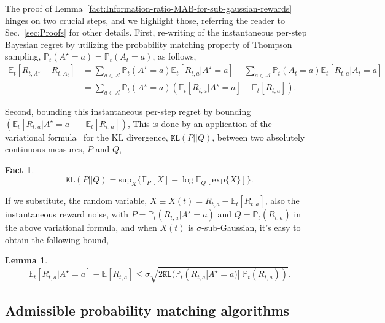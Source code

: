 \documentclass[10pt]{article}
\newtheorem{lemma}[thm]{Lemma}
\newtheorem{fact}[thm]{Fact}
\def\KL{\texttt{KL}}
\def\E{\mathbb{E}}
\newcommand{\A}{\mathcal{A}}
\newcommand{\Prob}{\mathbb{P}}
\begin{document}
The proof of Lemma~\ref{fact:Information-ratio-MAB-for-sub-gaussian-rewards} hinges on two crucial steps, and we highlight those, referring the reader to Sec.~\ref{sec:Proofs} for other details. First, re-writing of the instantaneous per-step Bayesian regret by utilizing the probability matching property of Thompson sampling, $\mathbb{P}_{t}(A^\star=a)= \mathbb{P}_{t}(A_{t}=a)$, as follows,
\begin{align}\label{Eq:Regret-decomposition}
\E_{t} \left[ R_{t,A^\star} - R_{t,A_{t}}\right] &= \sum_{a\in \A} \Prob_{t}(A^\star=a) \E_{t}\left[R_{t,a} | A^\star=a \right]- \sum_{a\in \A}\Prob_{t}(A_{t}=a)\E_{t}[ R_{t,a} | A_t=a] \ \\
&= \sum_{a\in \A} \Prob_{t}(A^\star=a)\left( \E_{t}\left[R_{t,a} | A^\star=a \right] - \E_{t}[ R_{t,a}]\right). \nonumber
\end{align} 

Second, bounding this instantaneous per-step regret by bounding $\left( \E_{t}\left[R_{t,a} | A^\star=a \right] - \E_{t}[ R_{t,a}]\right)$, This is done by an application of the variational formula~\citep{cover1999elements} for the KL divergence, ${\KL}(P||Q)$, between two absolutely continuous measures, $P$ and $Q$,
\begin{fact}
\label{fact:KL-var}
\[ \KL(P||Q)=\mathrm{sup}_{X}\{\E_{P}[X] - \log\E_{Q}[\mathrm{exp}\{X\}]\}. \]
\end{fact}

If we substitute, the random variable, $X \equiv X(t) = R_{t,a} -\E_{t}[R_{t,a}]$,  also the instantaneous reward noise, with $P = \Prob_{t}(R_{t,a} | A^\star=a)$ and $Q = \Prob_{t}(R_{t,a})$ in the above variational formula, and when $X(t)$ is $\sigma$-sub-Gaussian, it's easy to obtain the following bound,

\begin{lemma}\label{fact:KL-var-X}
\[
\E_{t}\left[R_{t,a} | A^\star=a \right] - \E[R_{t,a}] \le \sigma \sqrt{2\KL(\Prob_{t}(R_{t,a} | A^\star=a)||\Prob_t(R_{t,a}))}. \]
\end{lemma}


\subsection{Admissible probability matching algorithms} \label{subsec:Admissible-ProbMatch}
\end{document}
